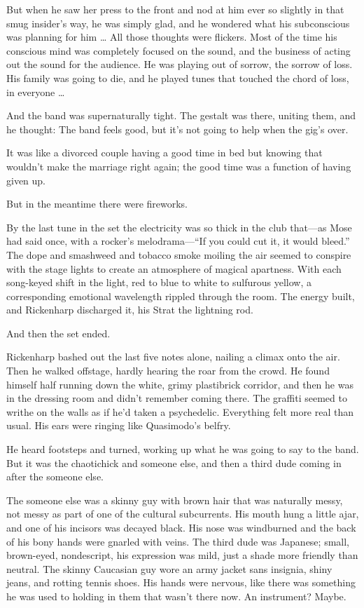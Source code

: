 But when he saw her press to the front and nod at him ever so slightly in that smug insider’s way, he was simply glad, and he wondered what his subconscious was planning for him … All those thoughts were flickers. Most of the time his conscious mind was completely focused on the sound, and the business of acting out the sound for the audience. He was playing out of sorrow, the sorrow of loss. His family was going to die, and he played tunes that touched the chord of loss, in everyone …

And the band was supernaturally tight. The gestalt was there, uniting them, and he thought: The band feels good, but it’s not going to help when the gig’s over.

It was like a divorced couple having a good time in bed but knowing that wouldn’t make the marriage right again; the good time was a function of having given up.

But in the meantime there were fireworks.

By the last tune in the set the electricity was so thick in the club that—as Mose had said once, with a rocker’s melodrama—“If you could cut it, it would bleed.” The dope and smashweed and tobacco smoke moiling the air seemed to conspire with the stage lights to create an atmosphere of magical apartness. With each song-keyed shift in the light, red to blue to white to sulfurous yellow, a corresponding emotional wavelength rippled through the room. The energy built, and Rickenharp discharged it, his Strat the lightning rod.

And then the set ended.

Rickenharp bashed out the last five notes alone, nailing a climax onto the air. Then he walked offstage, hardly hearing the roar from the crowd. He found himself half running down the white, grimy plastibrick corridor, and then he was in the dressing room and didn’t remember coming there. The graffiti seemed to writhe on the walls as if he’d taken a psychedelic. Everything felt more real than usual. His ears were ringing like Quasimodo’s belfry.

He heard footsteps and turned, working up what he was going to say to the band. But it was the chaotichick and someone else, and then a third dude coming in after the someone else.

The someone else was a skinny guy with brown hair that was naturally messy, not messy as part of one of the cultural subcurrents. His mouth hung a little ajar, and one of his incisors was decayed black. His nose was windburned and the back of his bony hands were gnarled with veins. The third dude was Japanese; small, brown-eyed, nondescript, his expression was mild, just a shade more friendly than neutral. The skinny Caucasian guy wore an army jacket sans insignia, shiny jeans, and rotting tennis shoes. His hands were nervous, like there was something he was used to holding in them that wasn’t there now. An instrument? Maybe.

